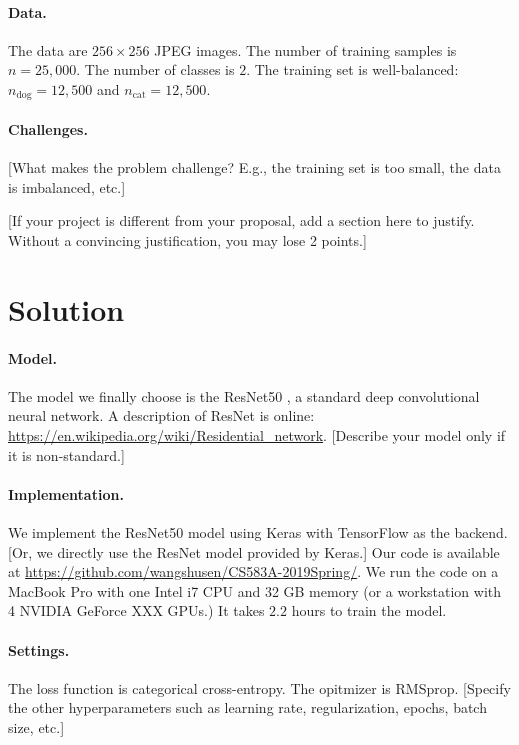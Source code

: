 \documentclass[11pt]{article}
\numberwithin{equation}{section}
\begin{document}
\paragraph{Data.} 
The data are $256\times 256$ JPEG images.
The number of training samples is $n=25,000$.
The number of classes is $2$.
The training set is well-balanced: $n_{\textrm{dog}} = 12,500$ and $n_{\textrm{cat}} = 12,500$.


\paragraph{Challenges.}
[What makes the problem challenge? E.g., the training set is too small, the data is imbalanced, etc.]



[If your project is different from your proposal, add a section here to justify. Without a convincing justification, you may lose 2 points.]


\section{Solution}

\paragraph{Model.}
The model we finally choose is the ResNet50 \cite{he2016deep}, a standard deep convolutional neural network.
A description of ResNet is online: \url{https://en.wikipedia.org/wiki/Residential_network}.
[Describe your model only if it is non-standard.]


\paragraph{Implementation.}
We implement the ResNet50 model using Keras with TensorFlow as the backend. [Or, we directly use the ResNet model provided by Keras.]
Our code is available at \url{https://github.com/wangshusen/CS583A-2019Spring/}.
We run the code on a MacBook Pro with one Intel i7 CPU and 32 GB memory (or a workstation with 4 NVIDIA GeForce XXX GPUs.)
It takes $2.2$ hours to train the model.


\paragraph{Settings.}
The loss function is categorical cross-entropy.
The opitmizer is RMSprop.
[Specify the other hyperparameters such as learning rate, regularization, epochs, batch size, etc.]
\end{document}
